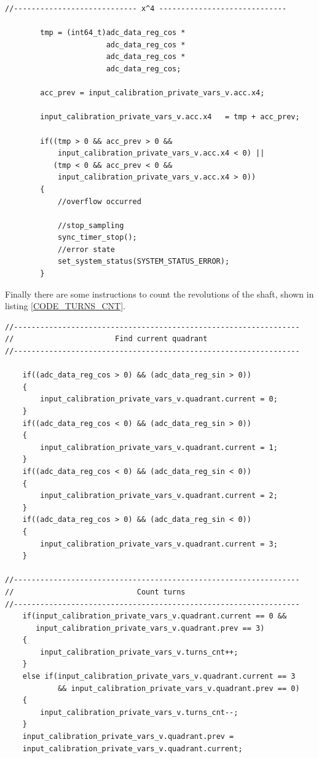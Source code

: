 \documentclass[main]{subfiles}
\begin{document}
\begin{minipage}[h]{\linewidth}
\begin{lstlisting}[caption=Samples accumulator update, label=CODE_ACC_UPD]
//---------------------------- x^4 -----------------------------
            
        tmp = (int64_t)adc_data_reg_cos * 
                       adc_data_reg_cos * 
                       adc_data_reg_cos * 
                       adc_data_reg_cos;

        acc_prev = input_calibration_private_vars_v.acc.x4;

        input_calibration_private_vars_v.acc.x4   = tmp + acc_prev;

        if((tmp > 0 && acc_prev > 0 && 
            input_calibration_private_vars_v.acc.x4 < 0) ||
           (tmp < 0 && acc_prev < 0 && 
            input_calibration_private_vars_v.acc.x4 > 0))
        {
            //overflow occurred

            //stop_sampling
            sync_timer_stop();
            //error state
            set_system_status(SYSTEM_STATUS_ERROR);
        }
\end{lstlisting}
\end{minipage}

Finally there are some instructions to count the revolutions of the shaft, shown 
in listing \ref{CODE_TURNS_CNT}.

\begin{minipage}[h]{\linewidth}
\begin{lstlisting}[caption=Turns counter, label=CODE_TURNS_CNT]
//-----------------------------------------------------------------
//                       Find current quadrant
//-----------------------------------------------------------------

    if((adc_data_reg_cos > 0) && (adc_data_reg_sin > 0))
    {
        input_calibration_private_vars_v.quadrant.current = 0;
    }
    if((adc_data_reg_cos < 0) && (adc_data_reg_sin > 0))
    {
        input_calibration_private_vars_v.quadrant.current = 1;
    }
    if((adc_data_reg_cos < 0) && (adc_data_reg_sin < 0))
    {
        input_calibration_private_vars_v.quadrant.current = 2;
    }
    if((adc_data_reg_cos > 0) && (adc_data_reg_sin < 0))
    {
        input_calibration_private_vars_v.quadrant.current = 3;
    }

//-----------------------------------------------------------------
//                            Count turns
//-----------------------------------------------------------------
    if(input_calibration_private_vars_v.quadrant.current == 0 && 
       input_calibration_private_vars_v.quadrant.prev == 3)
    {
        input_calibration_private_vars_v.turns_cnt++;
    }
    else if(input_calibration_private_vars_v.quadrant.current == 3 
            && input_calibration_private_vars_v.quadrant.prev == 0)
    {
        input_calibration_private_vars_v.turns_cnt--;
    }
    input_calibration_private_vars_v.quadrant.prev = 
    input_calibration_private_vars_v.quadrant.current;
\end{lstlisting}
\end{minipage}
\end{document}
